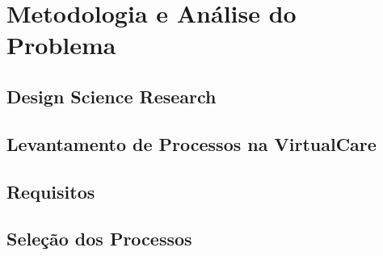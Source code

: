 \chapter{Metodologia e Análise do Problema}
\label{chap:metodologia}

\section{Design Science Research}
\label{sec:metodologia_dsr}

\section{Levantamento de Processos na VirtualCare}
\label{sec:metodologia_levantamento}

\section{Requisitos}
\label{sec:metodologia_requisitos}

\section{Seleção dos Processos}
\label{sec:metodologia_selecao}
